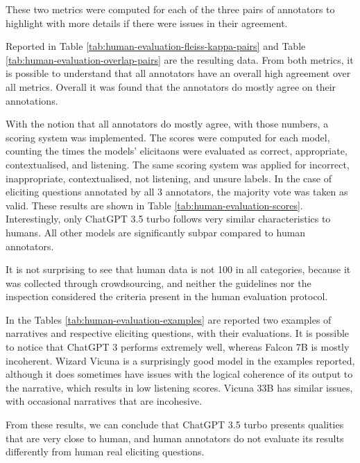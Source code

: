 
These two metrics were computed for each of the three pairs of annotators to highlight with more details if there were issues in their agreement. 


Reported in Table \ref{tab:human-evaluation-fleiss-kappa-pairs} and Table \ref{tab:human-evaluation-overlap-pairs} are the resulting data. From both metrics, it is possible to understand that all annotators have an overall high agreement over all metrics.
Overall it was found that the annotators do mostly agree on their annotations.


With the notion that all annotators do mostly agree, with those numbers, a scoring system was implemented. The scores were computed for each model, counting the times the models' elicitaons were evaluated as correct, appropriate, contextualised, and listening. The same scoring system was applied for incorrect, inappropriate, contextualised, not listening, and unsure labels. In the case of eliciting questions annotated by all 3 annotators, the majority vote was taken as valid. These results are shown in Table \ref{tab:human-evaluation-scores}.
Interestingly, only ChatGPT 3.5 turbo follows very similar characteristics to humans. All other models are significantly subpar compared to human annotators. 


% 
It is not surprising to see that human data is not 100 in all categories, because it was collected through crowdsourcing, and neither the guidelines nor the inspection considered the criteria present in the human evaluation protocol. 

In the Tables \ref{tab:human-evaluation-examples} are reported two examples of narratives and respective eliciting questions, with their evaluations. It is possible to notice that ChatGPT 3 performs extremely well, whereas Falcon 7B is mostly incoherent. Wizard Vicuna is a surprisingly good model in the examples reported, although it does sometimes have issues with the logical coherence of its output to the narrative, which results in low listening scores. Vicuna 33B has similar issues, with occasional narratives that are incohesive. 

From these results, we can conclude that ChatGPT 3.5 turbo presents qualities that are very close to human, and human annotators do not evaluate its results differently from human real eliciting questions. 

